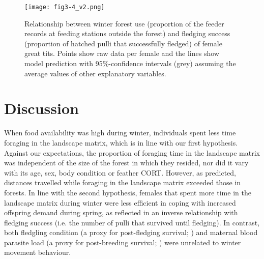 \documentclass[10pt, twoside]{book} %
\begin{document}
\begin{figure}[h]
	\begin{center}
		\texttt{[image: fig3-4\_v2.png]}
	\end{center}
	\caption{Relationship between winter forest use (proportion of the feeder records at feeding stations outside the forest) and fledging success (proportion of hatched pulli that successfully fledged) of female great tits. Points show raw data per female and the lines show model prediction with 95\%-confidence intervals (grey) assuming the average values of other explanatory variables.}\label{fig3-4}
\end{figure}

\clearpage	
	
	\section{Discussion}
	
When food availability was high during winter, individuals spent less time foraging in the landscape matrix, which is in line with our first hypothesis. Against our expectations, the proportion of foraging time in the landscape matrix was independent of the size of the forest in which they resided, nor did it vary with its age, sex, body condition or feather CORT. However, as predicted, distances travelled while foraging in the landscape matrix exceeded those in forests. In line with the second hypothesis, females that spent more time in the landscape matrix during winter were less efficient in coping with increased offspring demand during spring, as reflected in an inverse relationship with fledging success (i.e. the number of pulli that survived until fledging). In contrast, both fledgling condition (a proxy for post-fledging survival; \citealt{Perrins1965, Monros2002}) and maternal blood parasite load (a proxy for post-breeding survival; \citealt{Puente2010}) were unrelated to winter movement behaviour.\\
\end{document}
